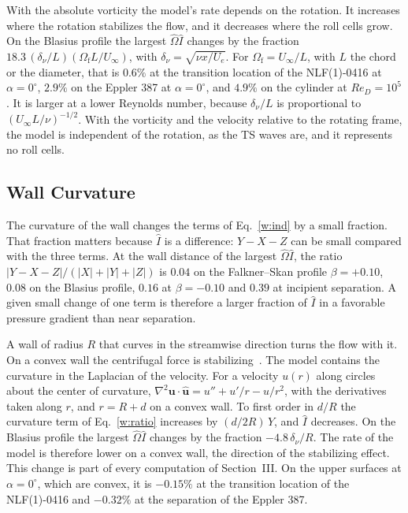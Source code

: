\documentclass[conf]{new-aiaa}
\begin{document}
With the absolute vorticity the model's rate depends on the rotation. It
increases where the rotation stabilizes the flow, and it decreases where the
roll cells grow. On the Blasius profile the largest $\hat\Omega\hat I$ changes
by the fraction $18.3\,(\delta_\nu/L)(\Omega_\mathrm{f}L/U_\infty)$, with
$\delta_\nu=\sqrt{\nu x/U_e}$. For $\Omega_\mathrm{f}=U_\infty/L$, with $L$ the chord or the diameter,
that is $0.6\%$ at the transition location of the NLF(1)-0416 at
$\alpha=0^\circ$, $2.9\%$ on the Eppler 387 at $\alpha=0^\circ$, and $4.9\%$
on the cylinder at $Re_D=10^5$. It is larger at a lower Reynolds number,
because $\delta_\nu/L$ is proportional to $(U_\infty L/\nu)^{-1/2}$. With the vorticity and the velocity relative to the
rotating frame, the model is independent of the rotation, as the TS waves
are, and it represents no roll cells.

\subsection{Wall Curvature}

The curvature of the wall changes the terms of Eq.~\eqref{w:ind} by a small
fraction. That fraction matters because $\hat I$ is a difference: $Y-X-Z$ can
be small compared with the three terms. At the wall distance of the largest
$\hat\Omega\hat I$, the ratio $|Y-X-Z|/(|X|+|Y|+|Z|)$ is $0.04$ on the
Falkner--Skan profile $\beta=+0.10$, $0.08$ on the Blasius profile, $0.16$ at
$\beta=-0.10$ and $0.39$ at incipient separation. A given small change of one
term is therefore a larger fraction of $\hat I$ in a favorable pressure
gradient than near separation.

A wall of radius $R$ that curves in the streamwise direction turns the flow
with it. On a convex wall the centrifugal force is
stabilizing~\cite{drazin_reid_1981}. The model contains the curvature in the
Laplacian of the velocity. For a velocity $u(r)$ along circles about the
center of curvature,
$\nabla^2\mathbf u\cdot\hat{\mathbf u}=u''+u'/r-u/r^2$, with the derivatives
taken along $r$, and $r=R+d$ on a convex wall. To first order in $d/R$ the
curvature term of Eq.~\eqref{w:ratio} increases by $(d/2R)\,Y$, and $\hat I$
decreases. On the Blasius profile the largest $\hat\Omega\hat I$ changes by
the fraction $-4.8\,\delta_\nu/R$. The rate of the model is therefore lower on
a convex wall, the direction of the stabilizing effect. This change is part
of every computation of Section~III. On the upper surfaces at
$\alpha=0^\circ$, which are convex, it is $-0.15\%$ at the transition
location of the NLF(1)-0416 and $-0.32\%$ at the separation of the
Eppler 387.
\end{document}
